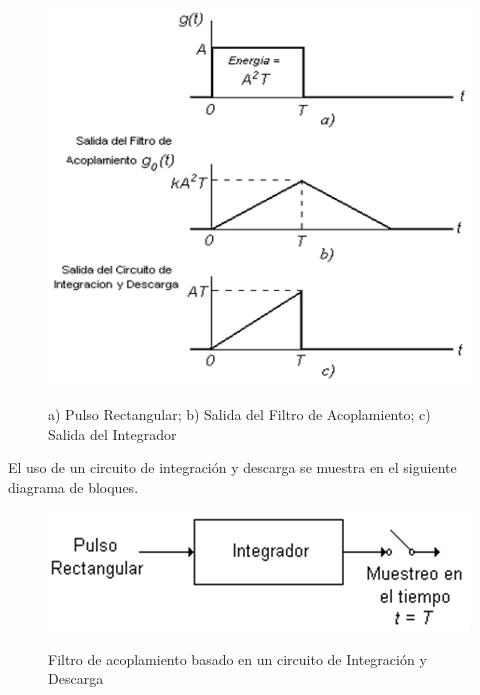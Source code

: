 \vspace{200px}
\begin{figure}[h!]
	\captionsetup{justification = raggedright, singlelinecheck = false}
	\caption{a) Pulso Rectangular; b) Salida del Filtro de Acoplamiento; c) Salida del Integrador } 
	\centering
	\includegraphics[scale=1]{Imagenes/Salida_filtro.png}
	\label{fig:Salida_filtro}
\end{figure}

El uso de un circuito de integración y descarga se muestra en el siguiente diagrama de bloques. \\

\begin{figure}[h!]
	\captionsetup{justification = raggedright, singlelinecheck = false}
	\caption{Filtro de acoplamiento basado en un circuito de Integración y Descarga } 
	\centering
	\includegraphics[scale=1]{Imagenes/Integrador.png}
	\label{fig:Integrador}
\end{figure}

